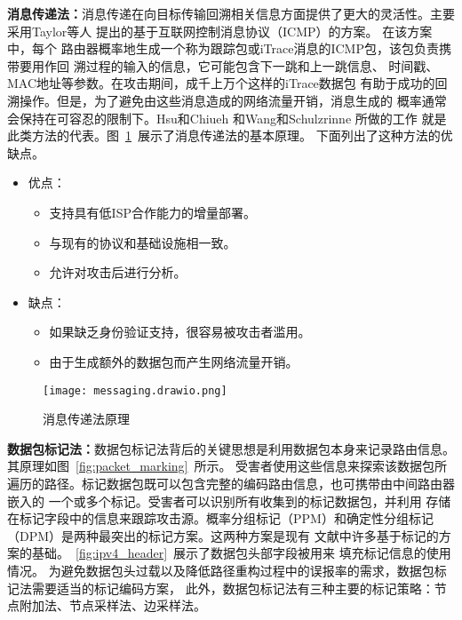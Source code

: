 \textbf{消息传递法：}消息传递在向目标传输回溯相关信息方面提供了更大的灵活性。主要采用Taylor等人
提出的基于互联网控制消息协议（ICMP）的方案\cite{Taylor2014ICMP}。
在该方案中，每个
路由器概率地生成一个称为跟踪包或iTrace消息的ICMP包，该包负责携带要用作回
溯过程的输入的信息，它可能包含下一跳和上一跳信息、
时间戳、MAC地址等参数。在攻击期间，成千上万个这样的iTrace数据包
有助于成功的回溯操作。但是，为了避免由这些消息造成的网络流量开销，消息生成的
概率通常会保持在可容忍的限制下。Hsu和Chiueh
\cite{Hsu2003TrafficSourceIdentification}和Wang和Schulzrinne
\cite{WangSchulzrinne2004DoS,WangSchulzrinne2004ReflectiveDoS}所做的工作
就是此类方法的代表。图~\ref{fig:messaging}~展示了消息传递法的基本原理。
下面列出了这种方法的优缺点。
\begin{itemize}
  \item 优点：
    \begin{itemize}
      \item 支持具有低ISP合作能力的增量部署。
      \item 与现有的协议和基础设施相一致。
      \item 允许对攻击后进行分析。
    \end{itemize}
  
  \item 缺点：
    \begin{itemize}
      \item 如果缺乏身份验证支持，很容易被攻击者滥用。
      \item 由于生成额外的数据包而产生网络流量开销。
    \end{itemize}

\end{itemize}

\begin{figure}[htbp]
  \centering
  \texttt{[image: messaging.drawio.png]}
  \caption{消息传递法原理}
  \label{fig:messaging}
\end{figure}


\textbf{数据包标记法：}数据包标记法背后的关键思想是利用数据包本身来记录路由信息。其原理如图~\ref{fig:packet_marking}~所示。
受害者使用这些信息来探索该数据包所遍历的路径。标记数据包既可以包含完整的编码路由信息，也可携带由中间路由器嵌入的
一个或多个标记。受害者可以识别所有收集到的标记数据包，并利用
存储在标记字段中的信息来跟踪攻击源。概率分组标记（PPM）和确定性分组标记
（DPM）是两种最突出的标记方案\cite{Burch2000Tracing}。这两种方案是现有
文献中许多基于标记的方案的基础。~\ref{fig:ipv4_header}~展示了数据包头部字段被用来
填充标记信息的使用情况。
为避免数据包头过载以及降低路径重构过程中的误报率的需求，数据包标记法需要适当的标记编码方案，
此外，数据包标记法有三种主要的标记策略：节点附加法、节点采样法、边采样法\cite{Alenezi2011}。

